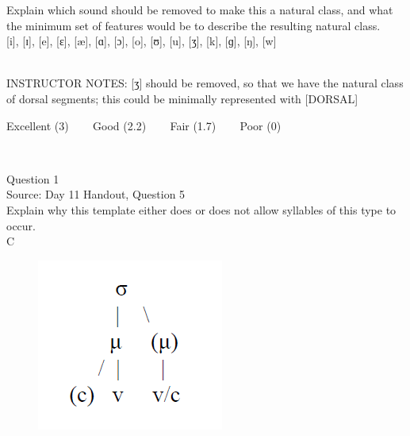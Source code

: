 \documentclass[12pt]{article}
\begin{document}
Explain which sound should be removed to make this a natural class, and what the minimum set of features would be to describe the resulting natural class.\\

{[i]}, {[ɪ]}, {[e]}, {[ɛ]}, {[æ]}, {[ɑ]}, {[ɔ]}, {[o]}, {[ʊ]}, {[u]}, {[ʒ]}, {[k]}, {[ɡ]}, {[ŋ]}, {[w]}


~\\
INSTRUCTOR NOTES: [ʒ] should be removed, so that we have the natural class of dorsal segments; this could be minimally represented with [DORSAL]


\vfill
Excellent (3) ~~~ Good (2.2) ~~~ Fair (1.7) ~~~ Poor (0)
\newpage

\begin{center}
\textbf{{\color{red}{\HUGE END OF EXAM}}}\\

\end{center}
\newpage

\begin{center}
\textbf{{\color{blue}{\HUGE START OF EXAM\\}}}

\textbf{{\color{blue}{\HUGE Student ID: 3419\\}}}

\textbf{{\color{blue}{\HUGE 5:20 - 5:40 PM\\}}}

\end{center}
\newpage

{\large Question 1}\\

Source: Day 11 Handout, Question 5\\

Explain why this template either does or does not allow syllables of this type to occur.\\

C

\begin{figure}[H]
\includegraphics{../images/ponapean_syllabletemplate.png}
\end{figure}
\end{document}
